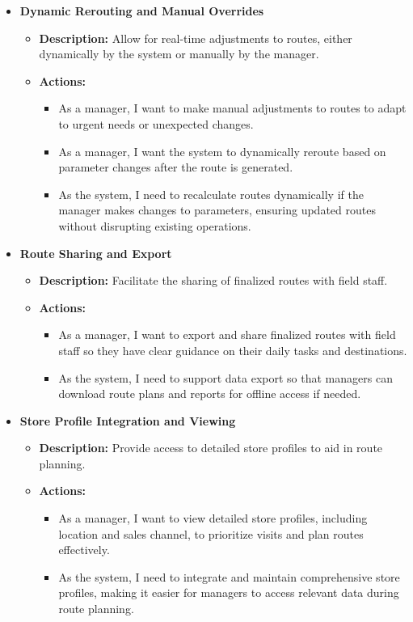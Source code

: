 \begin{itemize}
    \item \textbf{Dynamic Rerouting and Manual Overrides}
    \begin{itemize}
        \item \textbf{Description:} Allow for real-time adjustments to routes, either dynamically by the system or manually by the manager.
        \item \textbf{Actions:}
        \begin{itemize}
            \item As a manager, I want to make manual adjustments to routes to adapt to urgent needs or unexpected changes.
            \item As a manager, I want the system to dynamically reroute based on parameter changes after the route is generated.
            \item As the system, I need to recalculate routes dynamically if the manager makes changes to parameters, ensuring updated routes without disrupting existing operations.
        \end{itemize}
    \end{itemize}
    
    \item \textbf{Route Sharing and Export}
    \begin{itemize}
        \item \textbf{Description:} Facilitate the sharing of finalized routes with field staff.
        \item \textbf{Actions:}
        \begin{itemize}
            \item As a manager, I want to export and share finalized routes with field staff so they have clear guidance on their daily tasks and destinations.
            \item As the system, I need to support data export so that managers can download route plans and reports for offline access if needed.
        \end{itemize}
    \end{itemize}
    
    \item \textbf{Store Profile Integration and Viewing}
    \begin{itemize}
        \item \textbf{Description:} Provide access to detailed store profiles to aid in route planning.
        \item \textbf{Actions:}
        \begin{itemize}
            \item As a manager, I want to view detailed store profiles, including location and sales channel, to prioritize visits and plan routes effectively.
            \item As the system, I need to integrate and maintain comprehensive store profiles, making it easier for managers to access relevant data during route planning.
        \end{itemize}
    \end{itemize}
    

\end{itemize}
